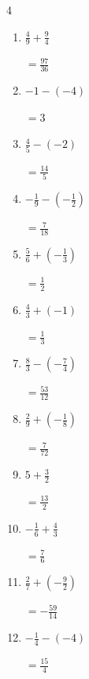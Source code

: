 \begin{multicols}{4}
\begin{enumerate}
  \item $\displaystyle \frac{4}{9} + \frac{9}{4}$

        $\displaystyle =\frac{97}{36}$

  \item $\displaystyle -1 - \left(-4\right)$

        $\displaystyle =3$

  \item $\displaystyle \frac{4}{5} - \left(-2\right)$

        $\displaystyle =\frac{14}{5}$

  \item $\displaystyle -\frac{1}{9} - \left(-\frac{1}{2}\right)$

        $\displaystyle =\frac{7}{18}$

  \item $\displaystyle \frac{5}{6} + \left(-\frac{1}{3}\right)$

        $\displaystyle =\frac{1}{2}$

\columnbreak %

  \item $\displaystyle \frac{4}{3} + \left(-1\right)$

        $\displaystyle =\frac{1}{3}$

  \item $\displaystyle \frac{8}{3} - \left(-\frac{7}{4}\right)$

        $\displaystyle =\frac{53}{12}$

  \item $\displaystyle \frac{2}{9} + \left(-\frac{1}{8}\right)$

        $\displaystyle =\frac{7}{72}$

  \item $\displaystyle 5 + \frac{3}{2}$

        $\displaystyle =\frac{13}{2}$

  \item $\displaystyle -\frac{1}{6} + \frac{4}{3}$

        $\displaystyle =\frac{7}{6}$

  \item $\displaystyle \frac{2}{7} + \left(-\frac{9}{2}\right)$

        $\displaystyle =-\frac{59}{14}$

  \item $\displaystyle -\frac{1}{4} - \left(-4\right)$

        $\displaystyle =\frac{15}{4}$


\end{enumerate}
\end{multicols}
